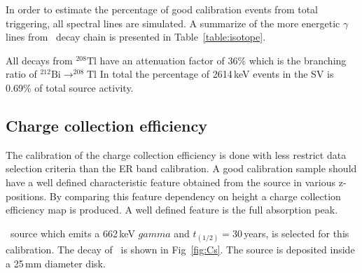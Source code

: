 In order to estimate the percentage of good calibration events from total triggering, all spectral lines are simulated.  
A summarize of the more energetic $\gamma$ lines from \Th\ decay chain is presented in Table~\ref{table:isotope}.
\begin{table}
\begin{center}
\caption{High energy gamma lines from \Th\ decay chain}
\label{table:isotope}
\end{center}
\end{table}

All decays from $^{208}\mathrm{Tl}$ have an attenuation factor of 36\% which is the branching ratio of $^{212}\mathrm{Bi} \rightarrow ^{208}\mathrm{Tl}$
In total the percentage of 2614\,keV events in the SV is 0.69\% of total source activity.

\subsection{Charge collection efficiency}
The calibration of the charge collection efficiency is done with less restrict data selection criteria than the ER band calibration. A good calibration sample  should have a well defined characteristic feature obtained from the source in various z-positions. By comparing this feature dependency on height a charge collection efficiency map is produced. A well defined feature is the full absorption peak. 

\Cs\ source which emits a 662\,keV $gamma$ and $t_(1/2) = 30$\,years, is selected for this calibration. The decay of \Cs\ is shown in Fig~\ref{fig:Cs}. The source is deposited inside a 25\,mm diameter disk. 


